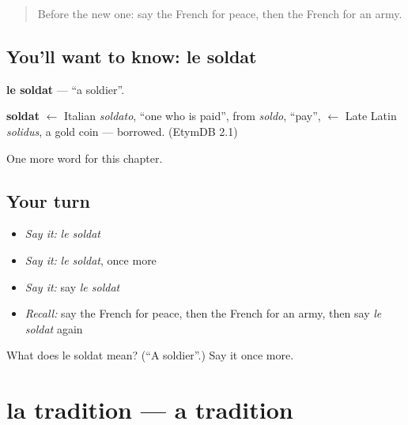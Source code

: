 \label{lesson:FR-C165-soldat}



\begin{quote}
Before the new one: say the French for peace, then the French for an army.
\end{quote}

\subsection*{You'll want to know: le soldat}
\textbf{le soldat} — \textquotedblleft{}a soldier\textquotedblright{}.

\begin{cousinweb}
\textbf{soldat} $\leftarrow$ Italian \emph{soldato}, \textquotedblleft{}one who is paid\textquotedblright{}, from \emph{soldo}, \textquotedblleft{}pay\textquotedblright{}, $\leftarrow$ Late Latin \emph{solidus}, a gold coin — borrowed. (EtymDB 2.1)
\end{cousinweb}

\begin{grammarlens}[title={What you've built}]
One more word for this chapter.
\end{grammarlens}

\subsection*{Your turn}
\begin{itemize}
\raggedright
  \item \emph{Say it:} \emph{le soldat}
  \item \emph{Say it:} \emph{le soldat}, once more
  \item \emph{Say it:} say \emph{le soldat}
  \item \emph{Recall:} say the French for peace, then the French for an army, then say \emph{le soldat} again
\end{itemize}

\begin{tcolorbox}[breakable,colback=teal!4,colframe=teal!35!black,title={Before you move on}]
What does le soldat mean? (\textquotedblleft{}A soldier\textquotedblright{}.) Say it once more.
\end{tcolorbox}
\section[la tradition]{la tradition — a tradition}

\label{lesson:FR-C165-tradition}




